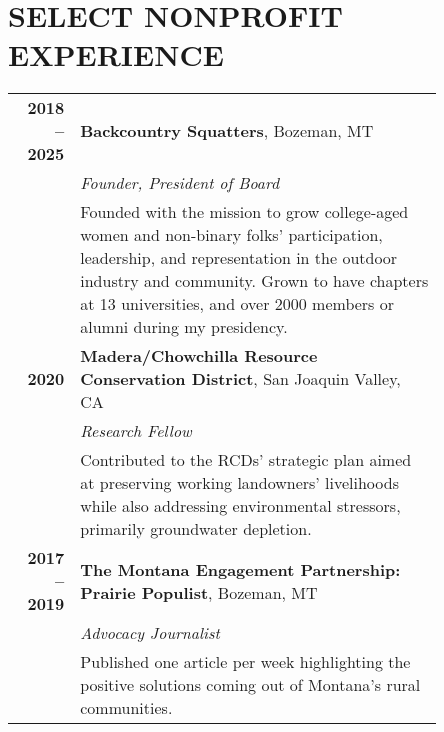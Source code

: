 \documentclass[11pt]{article}
\begin{document}
\section*{SELECT NONPROFIT EXPERIENCE}
\begin{longtable}{>{\bfseries}r p{0.85\linewidth}} %
2018 – 2025 & \textbf{Backcountry Squatters}, Bozeman, MT \\
    & \textit{Founder, President of Board} \\
    & Founded with the mission to grow college-aged women and non-binary folks’ participation, leadership, and representation in the outdoor industry and community. Grown to have chapters at 13 universities, and over 2000 members or alumni during my presidency. \\
2020 & \textbf{Madera/Chowchilla Resource Conservation District}, San Joaquin Valley, CA \\
    & \textit{Research Fellow}\\
    & Contributed to the RCDs’ strategic plan aimed at preserving working landowners’ livelihoods while also addressing environmental stressors, primarily groundwater depletion. \\
2017 – 2019 & \textbf{The Montana Engagement Partnership: Prairie Populist}, Bozeman, MT \\
    & \textit{Advocacy Journalist} \\
    & Published one article per week highlighting the positive solutions coming out of Montana’s rural communities. \\[1ex]
\end{longtable}
\end{document}

